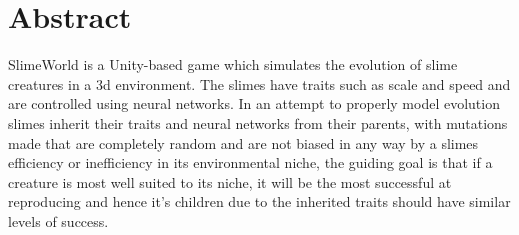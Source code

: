 \chapter{Abstract}
SlimeWorld is a Unity-based game which simulates the evolution of slime creatures in a 3d environment. The slimes have traits such as scale and speed and are controlled using neural networks. In an attempt to properly  model evolution slimes inherit their traits and neural networks from their parents, with mutations made that are completely random and are not biased in any way by a slimes efficiency or inefficiency in its environmental niche, the guiding goal is that if a creature is most well suited to its niche, it will be the most successful at reproducing and hence it's children due to the inherited traits should have similar levels of success.